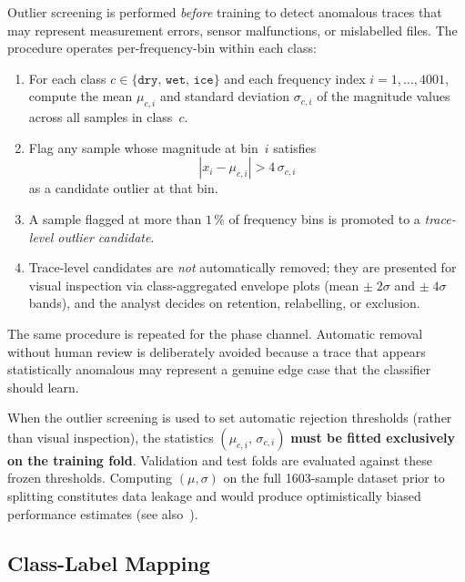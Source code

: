 Outlier screening is performed \emph{before} training to detect
anomalous traces that may represent measurement errors, sensor
malfunctions, or mislabelled files.  The procedure operates
per-frequency-bin within each class:

\begin{enumerate}
  \item For each class $c \in \{\texttt{dry},\,\texttt{wet},\,
        \texttt{ice}\}$ and each frequency index $i=1,\dots,4001$,
        compute the mean $\mu_{c,i}$ and standard deviation
        $\sigma_{c,i}$ of the magnitude values across all samples in
        class~$c$.
  \item Flag any sample whose magnitude at bin~$i$ satisfies
        \[
            |x_{i} - \mu_{c,i}| > 4\,\sigma_{c,i}
        \]
        as a candidate outlier at that bin.
  \item A sample flagged at more than $1\,\%$ of frequency bins is
        promoted to a \emph{trace-level outlier candidate}.
  \item Trace-level candidates are \emph{not} automatically removed;
        they are presented for visual inspection via class-aggregated
        envelope plots (mean $\pm\;2\sigma$ and $\pm\;4\sigma$ bands),
        and the analyst decides on retention, relabelling, or exclusion.
\end{enumerate}

The same procedure is repeated for the phase channel.  Automatic
removal without human review is deliberately avoided because a trace
that appears statistically anomalous may represent a genuine edge case
that the classifier should learn.

\begin{tcolorbox}[
  colback=red!5!white,
  colframe=red!75!black,
  title={\textbf{Anti-Leakage Requirement}},
  fonttitle=\bfseries
]
When the outlier screening is used to set automatic rejection
thresholds (rather than visual inspection), the statistics
$(\mu_{c,i},\,\sigma_{c,i})$ \textbf{must be fitted exclusively on
the training fold}.  Validation and test folds are evaluated against
these frozen thresholds.  Computing $(\mu,\sigma)$ on the full
\num{1603}-sample dataset prior to splitting constitutes data leakage
and would produce optimistically biased performance estimates (see
also~).
\end{tcolorbox}

\subsection{Class-Label Mapping}
\label{sec:preproc:labels}

